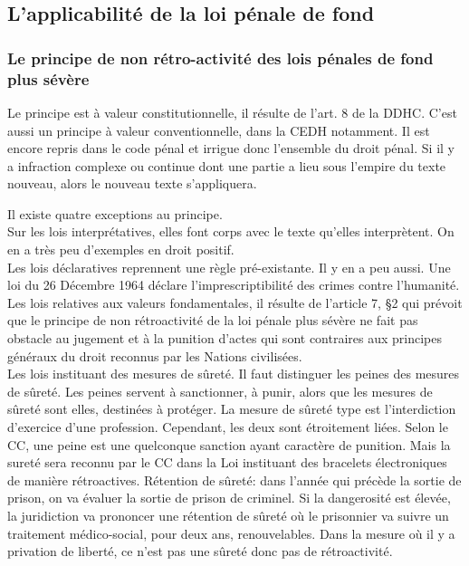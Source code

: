\documentclass[10pt, a4paper, openany]{book}
\begin{document}
\subsection{L'applicabilité de la loi pénale de fond}

\subsubsection{Le principe de non rétro-activité des lois pénales de fond plus sévère}

Le principe est à valeur constitutionnelle, il résulte de l'art. 8 de la DDHC. C'est aussi un principe à valeur conventionnelle, dans la CEDH notamment. Il est encore repris dans le code pénal et irrigue donc l'ensemble du droit pénal. Si il y a infraction complexe ou continue dont une partie a lieu sous l'empire du texte nouveau, alors le nouveau texte s'appliquera. 


Il existe quatre exceptions au principe. \\
Sur les lois interprétatives, elles font corps avec le texte qu'elles interprètent. On en a très peu d'exemples en droit positif. \\
Les lois déclaratives reprennent une règle pré-existante. Il y en a peu aussi. Une loi du 26 Décembre 1964 déclare l'imprescriptibilité des crimes contre l'humanité. \\
Les lois relatives aux valeurs fondamentales, il résulte de l'article 7, §2 qui prévoit que le principe de non rétroactivité de la loi pénale plus sévère ne fait pas obstacle au jugement et à la punition d'actes qui sont contraires aux principes généraux du droit reconnus par les Nations civilisées. \\
Les lois instituant des mesures de sûreté. Il faut distinguer les peines des mesures de sûreté. Les peines servent à sanctionner, à punir, alors que les mesures de sûreté sont elles, destinées à protéger. La mesure de sûreté type est l'interdiction d'exercice d'une profession. Cependant, les deux sont étroitement liées. Selon le CC, une peine est une quelconque sanction ayant caractère de punition. Mais la sureté sera reconnu par le CC dans la Loi instituant des bracelets électroniques de manière rétroactives. Rétention de sûreté: dans l'année qui précède la sortie de prison, on va évaluer la sortie de prison de criminel. Si la dangerosité est élevée, la juridiction va prononcer une rétention de sûreté où le prisonnier va suivre un traitement médico-social, pour deux ans, renouvelables. Dans la mesure où il y a privation de liberté, ce n'est pas une sûreté donc pas de rétroactivité. 
\end{document}
